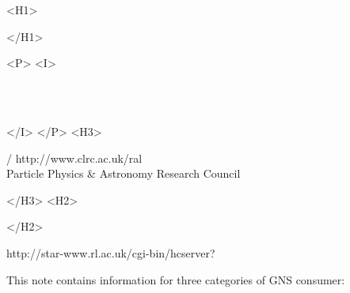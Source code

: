 \begin{htmlonly}
   \xlabel{}
   \begin{rawhtml} <H1> \end{rawhtml}
      \stardoctitle
   \begin{rawhtml} </H1> \end{rawhtml}


   \begin{rawhtml} <P> <I> \end{rawhtml}
   \stardoccategory \stardocnumber \\
   \stardocauthors \\
   \stardocdate
   \begin{rawhtml} </I> </P> <H3> \end{rawhtml}
       /
                        {http://www.clrc.ac.uk/ral} \\
      Particle Physics \& Astronomy Research Council \\
   \begin{rawhtml} </H3> <H2> \end{rawhtml}
   \begin{rawhtml} </H2> \end{rawhtml}
      {http://star-www.rl.ac.uk/cgi-bin/hcserver?\stardocsource}\\


\end{htmlonly}


\vspace{25mm}

This note contains information for three categories of GNS consumer:

